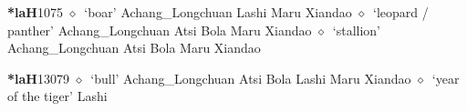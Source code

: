   \begin{list}{}{\leftmargin=1.5em \itemindent=-1.5em}
  \item {\footnotesize \textbf{*laH}}{\tiny 1075}
         $\diamond$~`boar'
         Achang\_Longchuan 
\hspace{1ex}
         Lashi 
\hspace{1ex}
         Maru 
\hspace{1ex}
         Xiandao 
\hspace{1ex}
         $\diamond$~`leopard / panther'
         Achang\_Longchuan 
\hspace{1ex}
         Atsi 
\hspace{1ex}
         Bola 
\hspace{1ex}
         Maru 
\hspace{1ex}
         Xiandao 
\hspace{1ex}
         $\diamond$~`stallion'
         Achang\_Longchuan 
\hspace{1ex}
         Atsi 
\hspace{1ex}
         Bola 
\hspace{1ex}
         Maru 
\hspace{1ex}
         Xiandao 
  \item {\footnotesize \textbf{*laH}}{\tiny 13079}
\hspace{1ex}
         $\diamond$~`bull'
         Achang\_Longchuan 
\hspace{1ex}
         Atsi 
\hspace{1ex}
         Bola 
\hspace{1ex}
         Lashi 
\hspace{1ex}
         Maru 
\hspace{1ex}
         Xiandao 
\hspace{1ex}
         $\diamond$~`year of the tiger'
         Lashi 

\end{list}
